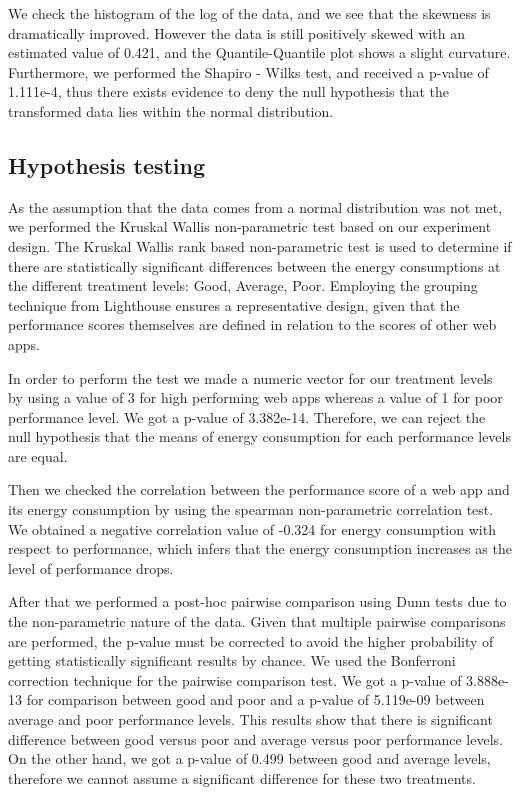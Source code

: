 We check the histogram of the log of the data, and we see that the skewness is dramatically improved. However the data is still positively skewed with an estimated value of 0.421, and the Quantile-Quantile plot shows a slight curvature. Furthermore, we performed the Shapiro - Wilks test, and received a p-value of 1.111e-4, thus there exists evidence to deny the null hypothesis that the transformed data lies within the normal distribution.


\subsection{Hypothesis testing}
As the assumption that the data comes from a normal distribution was not met, we performed the Kruskal Wallis non-parametric test based on our experiment design. 
The Kruskal Wallis rank based non-parametric test is used to determine if there are statistically significant differences between the energy consumptions at the different treatment levels: Good, Average, Poor. Employing the grouping technique from Lighthouse ensures a representative design, given that the performance scores themselves are defined in relation to the scores of other web apps.

In order to perform the test we made a numeric vector for our treatment levels by using a value of 3 for high performing web apps whereas a value of 1 for poor performance level. We got a p-value of 3.382e-14. Therefore, we can reject the null hypothesis that the means of energy consumption for each performance levels are equal.

Then we checked the correlation between the performance score of a web app and its energy consumption by using the spearman non-parametric correlation test. We obtained a negative correlation value of -0.324 for energy consumption with respect to performance, which infers that the energy consumption increases as the level of performance drops. 

After that we performed a post-hoc pairwise comparison using Dunn tests due to the non-parametric nature of the data. Given that multiple pairwise comparisons are performed, the p-value must be corrected to avoid the higher probability of getting statistically significant results by chance.  We used the Bonferroni correction technique for the pairwise comparison test. We got a p-value of 3.888e-13 for comparison between good and poor and a p-value of 5.119e-09 between average and poor performance levels. This results show that  there is significant difference between good versus poor and average versus poor performance levels. On the other hand, we got a p-value of 0.499 between good and average levels, therefore we cannot assume a significant difference for these two treatments.


